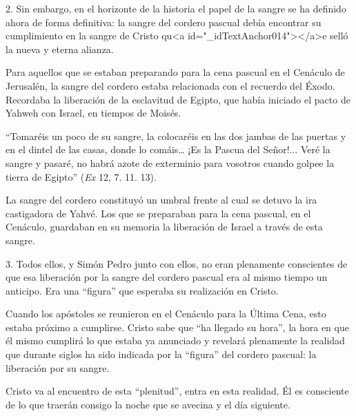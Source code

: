 			\begin{body}2. Sin embargo, en el horizonte de la historia el papel de la sangre se ha definido ahora de forma definitiva: la sangre del cordero pascual debía encontrar su cumplimiento en la sangre de Cristo qu<a id="_idTextAnchor014"></a>e selló la nueva y eterna alianza. \end{body}
			
			\begin{body}Para aquellos que se estaban preparando para la cena pascual en el Cenáculo de Jerusalén, la sangre del cordero estaba relacionada con el recuerdo del Éxodo. Recordaba la liberación de la esclavitud de Egipto, que había iniciado el pacto de Yahweh con Israel, en tiempos de Moisés. \end{body}
			
			\begin{body}“Tomaréis un poco de su sangre, la colocaréis en las dos jambas de las puertas y en el dintel de las casas, donde lo comáis… ¡Es la Pascua del Señor!... Veré la sangre y pasaré, no habrá azote de exterminio para vosotros cuando golpee la tierra de Egipto” (\textit{Ex} 12, 7. 11. 13). \end{body}
			
			\begin{body}La sangre del cordero constituyó un umbral frente al cual se detuvo la ira castigadora de Yahvé. Los que se preparaban para la cena pascual, en el Cenáculo, guardaban en su memoria la liberación de Israel a través de esta sangre. \end{body}
			
			\begin{body}3. Todos ellos, y Simón Pedro junto con ellos, no eran plenamente conscientes de que esa liberación por la sangre del cordero pascual era al mismo tiempo un anticipo. Era una “figura” que esperaba su realización en Cristo. \end{body}
			
			\begin{body}Cuando los apóstoles se reunieron en el Cenáculo para la Última Cena, esto estaba próximo a cumplirse. Cristo sabe que “ha llegado su hora”, la hora en que él mismo cumplirá lo que estaba ya anunciado y revelará plenamente la realidad que durante siglos ha sido indicada por la “figura” del cordero pascual: la liberación por su sangre. \end{body}
			
			\begin{body}Cristo va al encuentro de esta “plenitud”, entra en esta realidad. Él es consciente de lo que traerán consigo la noche que se avecina y el día siguiente. \end{body}
			
